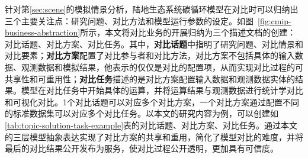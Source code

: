 针对第\ref{sec:scene}的模拟情景分析，陆地生态系统碳循环模型在对比时可以归纳出三个主要关注点：研究问题、对比方法和模型运行参数的设定。如图~\ref{fig:cmip-business-abstraction}所示，本文将对比业务的开展归纳为三个描述文档的创建：对比话题、对比方案、对比任务。其中，\textbf{对比话题}中指明了研究问题、对比情景和对比要素；\textbf{对比方案}配置了对比参与者和对比方法，对比方案不包括具体的输入数据、观测数据和模拟结果，他表示的仅仅是对比的配置项，从而实现对比过程的可共享性和可重用性；\textbf{对比任务}描述的是对比方案配置输入数据和观测数据实体的结果。模型在对比任务中开始具体的运算，并将运算结果与观测数据进行统计学对比和可视化对比。1个对比话题可以对应多个对比方案，一个对比方案通过配置不同的标准数据集可以对应多个对比任务。以本文的研究内容为例，可以创建如\ref{tab:topic-solution-task-example}表的对比话题、对比方案、对比任务。通过本文的三层模型抽象表达实现了对比方案的共享和重用，简化了模型对比的难度，并将最后的对比结果公开发布为服务，使对比过程公开透明，更加具有可信度。

